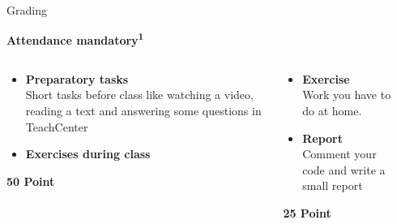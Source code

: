 \documentclass[aspectratio=169]{beamer}
\begin{document}
\begin{frame}{Grading}

    \vspace{-.8cm}
    \begin{coloredblock}[turquoise]
        \centering\footnotesize\textbf{Attendance mandatory\textsuperscript{1}}
    \end{coloredblock}

    \vspace{-0.5cm}
    \begin{columns}
        \begin{column}{0.32\textwidth}
            \begin{coloredblock}[blue][Participation][\footnotesize\centering][][6.5cm]
                \begin{itemize}
                    \item \footnotesize \textbf{Preparatory tasks}\\
                    Short tasks before class like watching a video, reading a text and answering some questions in TeachCenter
                    \item \footnotesize \textbf{Exercises during class}
                \end{itemize}
            \end{coloredblock}
            \centering \footnotesize \textbf{50 Point}
        \end{column}
        \begin{column}{0.32\textwidth}
            \begin{coloredblock}[blue][Homework 1][\footnotesize\centering][][6.5cm]
                \begin{itemize}
                    \item \footnotesize \textbf{Exercise}\\
                    Work you have to do at home.
                    \item \footnotesize \textbf{Report}\\
                    Comment your code and write a small report
                \end{itemize}
            \end{coloredblock}
            \centering \footnotesize \textbf{25 Point}
        \end{column}
        \begin{column}{0.32\textwidth}
            \begin{coloredblock}[blue][Homework 2][\footnotesize\centering][][6.5cm]
                \begin{itemize}

\end{itemize}
\end{coloredblock}
\end{column}
\end{columns}
\end{frame}
\end{document}
